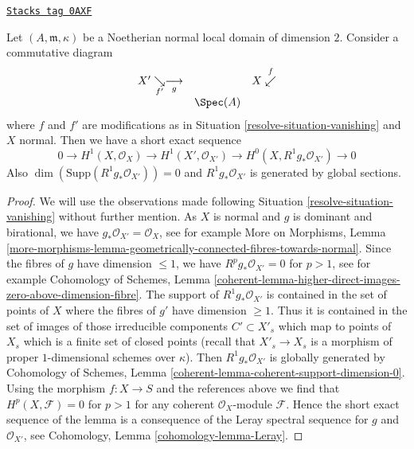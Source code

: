 \begin{lemma}
\label{resolve-lemma-exact-sequence}
\href{https://stacks.math.columbia.edu/tag/0AXF}{\texttt{Stacks tag 0AXF}}

Let $(A, \mathfrak m, \kappa)$ be a Noetherian normal local domain
of dimension $2$. Consider a commutative diagram
$$
\begin{array}{ccc}X' \underset{f'}{\searrow}\underset{g}{\longrightarrow} &  & X \overset{f}{\swarrow} \\  & \Spec(A) & \end{array}
$$
where $f$ and $f'$ are modifications as in Situation \ref{resolve-situation-vanishing}
and $X$ normal. Then we have a short exact sequence
$$
0 \to H^1(X, \mathcal{O}_X) \to H^1(X', \mathcal{O}_{X'}) \to
H^0(X, R^1g_*\mathcal{O}_{X'}) \to 0
$$
Also $\dim(\text{Supp}(R^1g_*\mathcal{O}_{X'})) = 0$
and $R^1g_*\mathcal{O}_{X'}$ is generated by global sections.
\end{lemma}

\begin{proof}

We will use the observations made following Situation \ref{resolve-situation-vanishing}
without further mention. As $X$ is normal and $g$ is dominant and
birational, we have $g_*\mathcal{O}_{X'} = \mathcal{O}_X$, see for
example More on Morphisms, Lemma
\ref{more-morphisms-lemma-geometrically-connected-fibres-towards-normal}.
Since the fibres of $g$ have dimension $\leq 1$, we have
$R^pg_*\mathcal{O}_{X'} = 0$ for $p > 1$, see for example
Cohomology of Schemes, Lemma
\ref{coherent-lemma-higher-direct-images-zero-above-dimension-fibre}.
The support of $R^1g_*\mathcal{O}_{X'}$ is contained in the set of points of
$X$ where the fibres of $g'$ have dimension $\geq 1$. Thus
it is contained in the set of images of those
irreducible components $C' \subset X'_s$ which map to points of $X_s$
which is a finite set of closed points
(recall that $X'_s \to X_s$ is a morphism of proper $1$-dimensional
schemes over $\kappa$). Then $R^1g_*\mathcal{O}_{X'}$ is globally
generated by
Cohomology of Schemes, Lemma \ref{coherent-lemma-coherent-support-dimension-0}.
Using the morphism $f : X \to S$ and the references above we find that
$H^p(X, \mathcal{F}) = 0$ for $p > 1$ for any coherent $\mathcal{O}_X$-module
$\mathcal{F}$. Hence the short exact sequence of the lemma is a consequence
of the Leray spectral sequence for $g$ and $\mathcal{O}_{X'}$, see
Cohomology, Lemma \ref{cohomology-lemma-Leray}.
\end{proof}

